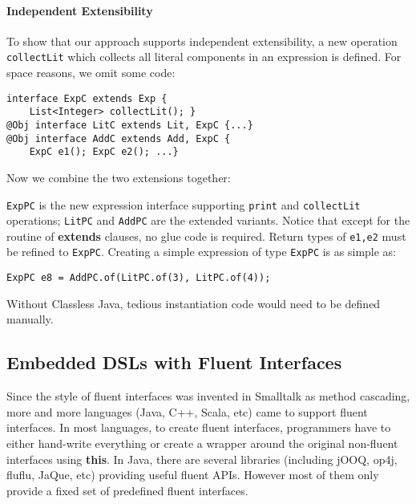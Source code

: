\paragraph{Independent Extensibility}
To show that our approach supports independent extensibility, a
new operation \texttt{collectLit} which collects all
literal components in an expression is defined. For space reasons,
we omit some code:

\begin{lstlisting}[]
interface ExpC extends Exp {
    List<Integer> collectLit(); }
@Obj interface LitC extends Lit, ExpC {...}
@Obj interface AddC extends Add, ExpC {
    ExpC e1(); ExpC e2(); ...}
\end{lstlisting}

\noindent Now we combine the two extensions together:


\noindent \texttt{ExpPC} is the new expression interface supporting
\texttt{print} and \texttt{collectLit} operations; \texttt{LitPC} and
\texttt{AddPC} are the extended variants. Notice that except for the routine of
\textbf{extends} clauses, no glue code is required. Return types of
\texttt{e1,e2} must be refined to \texttt{ExpPC}.
Creating a simple expression of type \texttt{ExpPC} is
as simple as:
\begin{lstlisting}
ExpPC e8 = AddPC.of(LitPC.of(3), LitPC.of(4));
\end{lstlisting}
\noindent Without Classless Java, tedious instantiation code would need
to be defined manually.

\subsection{Embedded DSLs with Fluent Interfaces}\label{sec:dsls}
Since the style of fluent interfaces was invented in Smalltalk as method
cascading, more and more languages (Java, C++, Scala, etc) came to support fluent interfaces. In most languages, to create fluent
interfaces, programmers have to either hand-write everything or create a wrapper
around the original non-fluent interfaces using \textbf{this}. In Java, there
are several libraries (including jOOQ, op4j, fluflu, JaQue, etc) providing useful
fluent APIs. However most of them only provide a fixed set of predefined fluent
interfaces. %


